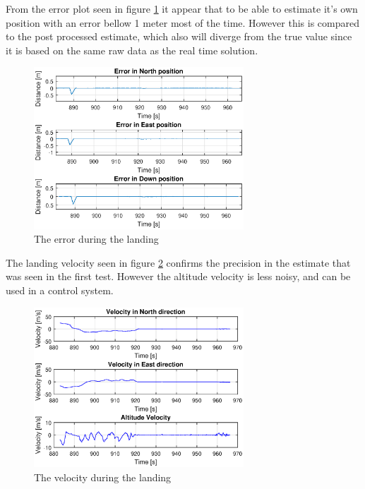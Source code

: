 From the error plot seen in figure \ref{figure:landingErrorNorthEastDownFlight} it appear that to be able to estimate it's own position with an error bellow 1 meter most of the time. However this is compared to the post processed estimate, which also will diverge from the true value since it is based on the same raw data as the real time solution.

\begin{figure}[H]
	\centering
		\includegraphics[width=0.7\textwidth]{figs/plots/landingErrorNorthEastDownFlight.eps}
		\caption{The error during the landing}
		\label{figure:landingErrorNorthEastDownFlight}
\end{figure}
The landing velocity seen in figure \ref{figure:landingVelocity} confirms the precision in the estimate that was seen in the first test. However the altitude velocity is less noisy, and can be used in a control system.
\begin{figure}[H]
	\centering
		\includegraphics[width=0.7\textwidth]{figs/plots/landingVelocity.eps}
		\caption{The velocity during the landing}
		\label{figure:landingVelocity}
\end{figure}
\cleardoublepage